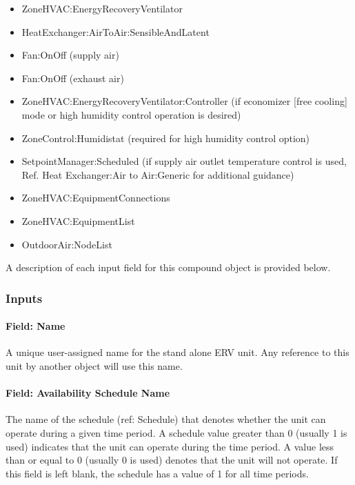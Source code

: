 \begin{itemize}
\item
  ZoneHVAC:EnergyRecoveryVentilator
\item
  HeatExchanger:AirToAir:SensibleAndLatent
\item
  Fan:OnOff (supply air)
\item
  Fan:OnOff (exhaust air)
\item
  ZoneHVAC:EnergyRecoveryVentilator:Controller (if economizer {[}free cooling{]} mode or high humidity control operation is desired)
\item
  ZoneControl:Humidistat (required for high humidity control option)
\item
  SetpointManager:Scheduled (if supply air outlet temperature control is used, Ref. Heat Exchanger:Air to Air:Generic for additional guidance)
\item
  ZoneHVAC:EquipmentConnections
\item
  ZoneHVAC:EquipmentList
\item
  OutdoorAir:NodeList
\end{itemize}

A description of each input field for this compound object is provided below.

\subsubsection{Inputs}\label{inputs-13-018}

\paragraph{Field: Name}\label{field-name-13-012}

A unique user-assigned name for the stand alone ERV unit. Any reference to this unit by another object will use this name.

\paragraph{Field: Availability Schedule Name}\label{field-availability-schedule-name-12-001}

The name of the schedule (ref: Schedule) that denotes whether the unit can operate during a given time period. A schedule value greater than 0 (usually 1 is used) indicates that the unit can operate during the time period. A value less than or equal to 0 (usually 0 is used) denotes that the unit will not operate. If this field is left blank, the schedule has a value of 1 for all time periods.

